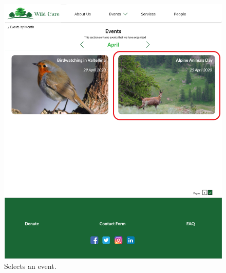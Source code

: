 	\begin{figure}[h!]
		\centering
		\begin{minipage}[b]{1\textwidth}
    			\includegraphics[width=\textwidth]{./assets/mockups/eventsbymonth_event.png}
			\caption{Selects an event.}
		\end{minipage}
	\end{figure}

